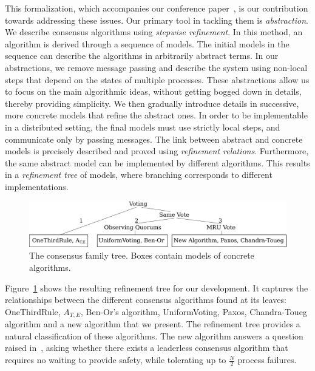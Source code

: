 \documentclass[12pt]{article}
\begin{document}
This formalization, which accompanies our conference
paper~\cite{maric_consensus_15}, is our contribution towards
addressing these issues. Our primary tool in tackling them is
\emph{abstraction}. We describe consensus algorithms using
\emph{stepwise refinement}. In this method, an algorithm is derived
through a sequence of models. The initial models in the sequence can
describe the algorithms in arbitrarily abstract terms. In our
abstractions, we remove message passing and describe the system using
non-local steps that depend on the states of multiple processes. These
abstractions allow us to focus on the main algorithmic ideas, without
getting bogged down in details, thereby providing simplicity. We then
gradually introduce details in successive, more concrete models that
refine the abstract ones. In order to be implementable in a
distributed setting, the final models must use strictly local steps,
and communicate only by passing messages. The link between abstract
and concrete models is precisely described and proved using
\emph{refinement relations}. Furthermore, the same abstract model can
be implemented by different algorithms. This results in a
\emph{refinement tree} of models, where branching corresponds to
different implementations.

\begin{figure}[t]
  \centering
  \includegraphics[scale=0.35]{ref-tree}
  \caption{The consensus family tree. Boxes contain models of concrete algorithms.}
  \label{fig:consensus-tree}
\end{figure}

Figure~\ref{fig:consensus-tree} shows the resulting refinement tree
for our development. It captures the relationships between the
different consensus algorithms found at its leaves: OneThirdRule,
$A_{T,E}$, Ben-Or's algorithm, UniformVoting, Paxos, Chandra-Toueg
algorithm and a new algorithm that we present. The refinement tree
provides a natural classification of these algorithms. The new
algorithm answers a question raised
in~\cite{charron-bost_heard-model:_2009}, asking whether there exists
a leaderless consensus algorithm that requires no waiting to provide
safety, while tolerating up to $\frac{N}{2}$ process failures.
\end{document}

